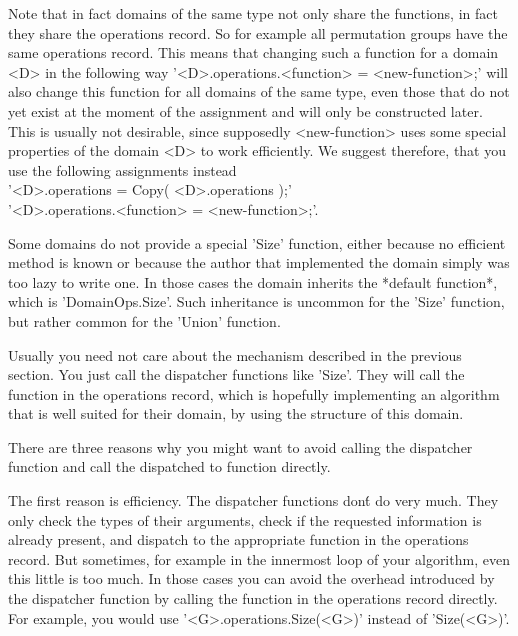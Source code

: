 Note that in fact domains of the  same type not only share the functions,
in fact they share the operations record.  So for example all permutation
groups have the same operations record.  This means  that changing such a
function for a domain <D> in the following way '<D>.operations.<function>
\:= <new-function>;' will also change this  function for  all  domains of
the  same type, even those that do not  yet exist at  the  moment  of the
assignment  and will  only  be  constructed  later.  This  is usually not
desirable, since supposedly <new-function> uses  some  special properties
of the domain <D> to  work efficiently.   We suggest  therefore, that you
use the following assignments instead\: \\
'<D>.operations \:= Copy( <D>.operations );'\\
'<D>.operations.<function> \:= <new-function>;'.

Some domains do not provide a special 'Size' function,  either because no
efficient method is  known  or because the   author that implemented  the
domain simply was  too  lazy to write  one.   In those cases   the domain
inherits the *default    function*, which   is 'DomainOps.Size'.     Such
inheritance  is uncommon for  the 'Size' function,  but rather common for
the 'Union' function.


Usually you  need not care about  the mechanism described in the previous
section.  You just call the  dispatcher functions like 'Size'.  They will
call  the   function  in  the   operations   record,  which  is hopefully
implementing an algorithm that is well  suited for their domain, by using
the structure of this domain.

There  are three  reasons  why  you  might  want  to  avoid  calling  the
dispatcher function and call the dispatched to function directly.

The first reason is efficiency.  The  dispatcher functions don\'t do very
much.   They   only check the types    of their arguments,  check  if the
requested information is already present, and dispatch to the appropriate
function in the  operations record.   But  sometimes, for example  in the
innermost loop of your algorithm, even this little is too much.  In those
cases you can avoid the overhead introduced by the dispatcher function by
calling the function in the operations record directly.  For example, you
would use '<G>.operations.Size(<G>)' instead of 'Size(<G>)'.

